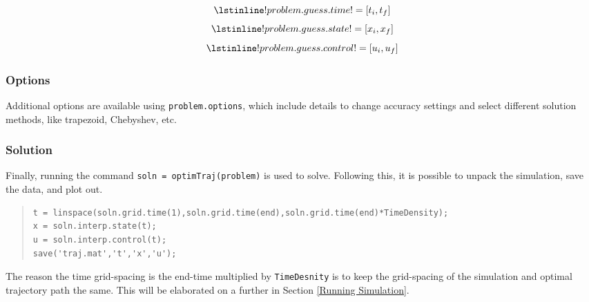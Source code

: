 \documentclass[12pt]{article}
\begin{document}
\begin{figure}[H]
\begin{equation*}
\lstinline!problem.guess.time! = [t_{i}, t_{f}]
\end{equation*}
\begin{equation*}
\lstinline!problem.guess.state! = [x_{i}, x_{f}]
\end{equation*}
\begin{equation*}
\lstinline!problem.guess.control! = [u_{i}, u_{f}] 
\end{equation*}
\end{figure}
\subsubsection{Options}
Additional options are available using \lstinline!problem.options!, which include details to change accuracy settings and select different solution methods, like trapezoid, Chebyshev, etc.
\subsubsection{Solution}
Finally, running the command \lstinline!soln = optimTraj(problem)! is used to solve. Following this, it is possible to unpack the simulation, save the data, and plot out.
\begin{quote}
\begin{lstlisting}
t = linspace(soln.grid.time(1),soln.grid.time(end),soln.grid.time(end)*TimeDensity);
x = soln.interp.state(t);
u = soln.interp.control(t);
save('traj.mat','t','x','u');
\end{lstlisting}
\end{quote}

The reason the time grid-spacing is the end-time multiplied by \lstinline!TimeDesnity! is to keep the grid-spacing of the simulation and optimal trajectory path the same. This will be elaborated on a further in Section \ref{Running Simulation}.

\end{document}
